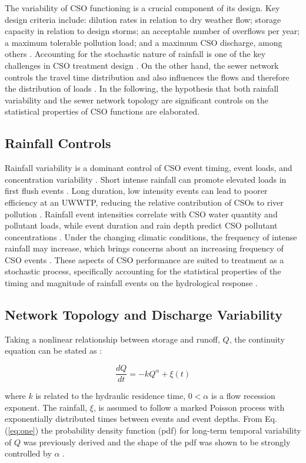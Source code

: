 \documentclass{agujournal2018}
\begin{document}
The variability of CSO functioning is a crucial component of its design. Key design criteria include: dilution rates in relation to dry weather f\/low; storage capacity in relation to design storms; an acceptable number of overf\/lows per year; a maximum tolerable pollution load; and a maximum CSO discharge, among others \citep{Riechel_2016}. Accounting for the stochastic nature of rainfall is one of the key challenges in CSO treatment design \citep{Geiger_1998}. On the other hand, the sewer network controls the travel time distribution and also inf\/luences the f\/lows and therefore the distribution of loads \citep{LHOMME_2004}. In the following, the hypothesis that both rainfall variability and the sewer network topology are signif\/icant controls on the statistical properties of CSO functions are elaborated.

\subsection{Rainfall Controls}
Rainfall variability is a dominant control of CSO event timing, event loads, and concentration variability \citep{COUTU2012477,Geiger_1998,Sandoval_2013}. Short intense rainfall can promote elevated loads in f\/irst f\/lush events \citep{Krebs_1999}. Long duration, low intensity events can lead to poorer ef\/f\/iciency at an UWWTP, reducing the relative contribution of CSOs to river pollution \citep{Phillips_2012}. Rainfall event intensities correlate with CSO water quantity and pollutant loads, while event duration and rain depth predict CSO pollutant concentrations \citep{Sandoval_2013}. Under the changing climatic conditions, the frequency of intense rainfall may increase, which brings concerns about an increasing frequency of CSO events \citep{Semadeni_Davies_2008,Sterk_2016}. These aspects of CSO performance are suited to treatment as a stochastic process, specif\/ically accounting for the statistical properties of the timing and magnitude of rainfall events on the hydrological response \citep{Botter_2009}.
     
\subsection{Network Topology and Discharge Variability}
Taking a nonlinear relationship between storage and runof\/f, $Q$, the continuity equation can be stated as \citep{Botter_2009}:
\begin{linenomath*}
\begin{equation}
\frac{dQ}{dt} = -k Q^\alpha+\xi(t)
\label{eq:one}
\end{equation}
\end{linenomath*}
where $k$ is related to the hydraulic residence time, $0< \alpha$ is a f\/low recession exponent. The rainfall, $\xi$, is assumed to follow a marked Poisson process with exponentially distributed times between events and event depths. From Eq. (\ref{eq:one}) the probability density function (pdf) for long-term temporal variability of $Q$ was previously derived and the shape of the pdf was shown to be strongly controlled by $\alpha$ \citep{Botter_2009}.
\end{document}
